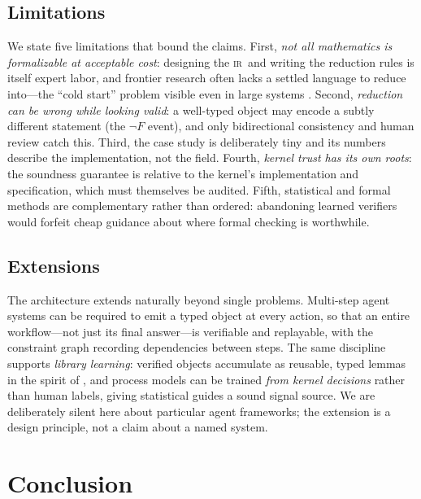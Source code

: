 \documentclass[11pt,a4paper]{article}
\newcommand{\ir}{\textsc{ir}\xspace}
\theoremstyle{plain}
\theoremstyle{definition}
\theoremstyle{remark}
\begin{document}
\subsection{Limitations}
We state five limitations that bound the claims. First, \emph{not all
mathematics is formalizable at acceptable cost}: designing the \ir\ and
writing the reduction rules is itself expert labor, and frontier research
often lacks a settled language to reduce into---the ``cold start'' problem
visible even in large systems \citep{hubert2025alphaproof}. Second,
\emph{reduction can be wrong while looking valid}: a well-typed object may
encode a subtly different statement (the $\neg F$ event), and only
bidirectional consistency and human review catch this. Third, the case
study is deliberately tiny and its numbers describe the implementation,
not the field. Fourth, \emph{kernel trust has its own roots}: the
soundness guarantee is relative to the kernel's implementation and
specification, which must themselves be audited. Fifth, statistical and
formal methods are complementary rather than ordered: abandoning learned
verifiers would forfeit cheap guidance about where formal checking is
worthwhile.

\subsection{Extensions}
The architecture extends naturally beyond single problems. Multi-step
agent systems can be required to emit a typed object at every action, so
that an entire workflow---not just its final answer---is verifiable and
replayable, with the constraint graph recording dependencies between
steps. The same discipline supports \emph{library learning}: verified
objects accumulate as reusable, typed lemmas in the spirit of
\citep{wang2024lego}, and process models can be trained \emph{from kernel
decisions} rather than human labels, giving statistical guides a sound
signal source. We are deliberately silent here about particular agent
frameworks; the extension is a design principle, not a claim about a named
system.

\section{Conclusion}\label{sec:conclusion}
\end{document}

